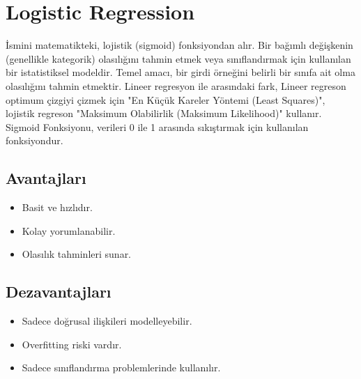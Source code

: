 \section{Logistic Regression}
İsmini matematikteki, lojistik (sigmoid) fonksiyondan alır. Bir bağımlı değişkenin (genellikle kategorik) olasılığını tahmin etmek veya sınıflandırmak için kullanılan bir istatistiksel modeldir. Temel amacı, bir girdi örneğini belirli bir sınıfa ait olma olasılığını tahmin etmektir. Lineer regresyon ile arasındaki fark, Lineer regreson optimum çizgiyi çizmek için "En Küçük Kareler Yöntemi (Least Squares)", lojistik regreson "Maksimum Olabilirlik (Maksimum Likelihood)" kullanır. Sigmoid Fonksiyonu, verileri 0 ile 1 arasında sıkıştırmak için kullanılan fonksiyondur.

\subsection{Avantajları}
\begin{itemize}
    \item Basit ve hızlıdır.
    \item Kolay yorumlanabilir.
    \item Olasılık tahminleri sunar.
\end{itemize}

\subsection{Dezavantajları}
\begin{itemize}
    \item Sadece doğrusal ilişkileri modelleyebilir.
    \item Overfitting riski vardır.
    \item Sadece sınıflandırma problemlerinde kullanılır.
\end{itemize}

\newpage